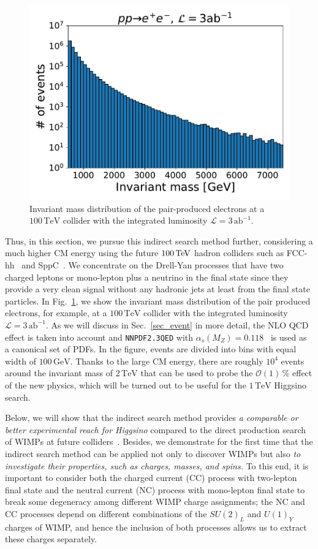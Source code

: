 \documentclass[12pt,twoside,book]{article}
\begin{document}
\begin{figure}[t]
  \centering
  \includegraphics[width=0.5\hsize]{histMee.pdf}
  \caption{
    Invariant mass distribution of the pair-produced electrons at a $100\,\mathrm{TeV}$ collider with the integrated luminosity $\mathcal{L} = 3\,\mathrm{ab}^{-1}$.
  }
  \label{fig:histMee}
\end{figure}

Thus, in this section, we pursue this indirect search method further, considering a much higher CM energy using the future $100\,{\rm TeV}$ hadron colliders such as FCC-hh~\cite{Mangano:2016jyj, Contino:2016spe, Golling:2016gvc, Benedikt:2651300} and SppC~\cite{CEPC-SPPCStudyGroup:2015csa, CEPC-SPPCStudyGroup:2015esa}.
We concentrate on the Drell-Yan processes that have two charged leptons or mono-lepton plus a neutrino in the final state since they provide a very clean signal without any hadronic jets at least from the final state particles.
In Fig.~\ref{fig:histMee}, we show the invariant mass distribution of the pair produced electrons, for example, at a $100\,\mathrm{TeV}$ collider with the integrated luminosity $\mathcal{L} = 3\,\mathrm{ab}^{-1}$.
As we will discuss in Sec.~\ref{sec_event} in more detail, the NLO QCD effect is taken into account and \texttt{NNPDF2.3QED} with $\alpha_s (M_Z) = 0.118$~\cite{Ball:2013hta} is used as a canonical set of PDFs.
In the figure, events are divided into bins with equal width of $100\,\mathrm{GeV}$.
Thanks to the large CM energy, there are roughly $10^4$ events around the invariant mass of $2\,\mathrm{TeV}$ that can be used to probe the $\mathcal{O}(1)\,\%$ effect of the new physics, which will be turned out to be useful for the $1\,\mathrm{TeV}$ Higgsino search.

Below, we will show that the indirect search method provides \textit{a comparable or better experimental reach for Higgsino} compared to the direct production search of WIMPs at future colliders~\cite{Low:2014cba, Cirelli:2014dsa, Han:2018wus, Mahbubani:2017gjh}.
Besides, we demonstrate for the first time that the indirect search method can be applied not only to discover WIMPs but also \textit{to investigate their properties, such as charges, masses, and spins.}
To this end, it is important to consider both the charged current (CC) process with two-lepton final state and the neutral current (NC) process with mono-lepton final state to break some degeneracy among different WIMP charge assignments; the NC and CC processes depend on different combinations of the $SU(2)_L$ and $U(1)_Y$ charges of WIMP, and hence the inclusion of both processes allows us to extract these charges separately.
\end{document}
